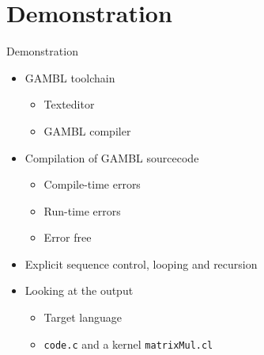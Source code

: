\section{Demonstration} %
\label{sec:demonstration}
\begin{frame}{Demonstration}
    \begin{itemize}
        \item GAMBL toolchain
        \begin{itemize}
            \item Texteditor
            \item GAMBL compiler 
        \end{itemize}
        \item Compilation of GAMBL sourcecode
        \begin{itemize}
            \item Compile-time errors
            \item Run-time errors
            \item Error free
        \end{itemize}
        \item Explicit sequence control, looping and recursion
        \item Looking at the output
        \begin{itemize}
            \item Target language
            \item \texttt{code.c} and a kernel \texttt{matrixMul.cl}
        \end{itemize}
    \end{itemize}
\end{frame}

